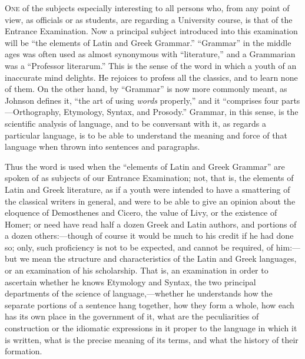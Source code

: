 O\textsc{ne} of the subjects especially interesting to all persons who, from
any point of view, as officials or as students, are regarding a
University course, is that of the Entrance Examination. Now a
principal subject introduced into this examination will be ``the
elements of Latin and Greek Grammar.'' ``Grammar'' in the
middle ages was often used as almost synonymous with
``literature,'' and a Grammarian was a ``Professor
literarum.'' This is the sense of the word in which a youth of an
inaccurate mind delights. He rejoices to profess all the classics, and
to learn none of them. On the other hand, by ``Grammar'' is
now more commonly meant, as Johnson defines it, ``the art of using
\emph{words} properly,'' and it ``comprises four parts—Orthography,
Etymology, Syntax, and Prosody.'' Grammar, in this sense, is the
scientific analysis of language, and to be conversant with it, as
regards a particular language, is to be able to understand the meaning
and force of that language when thrown into sentences and paragraphs.

Thus the word is used when the ``elements of Latin and Greek
Grammar'' are spoken of as subjects of our Entrance Examination;
not, that is, the elements of Latin and Greek literature, as if a
youth were intended to have a smattering of the classical writers in
general, and were to be able to give an opinion about the eloquence of
Demosthenes and Cicero, the value of Livy, or the existence of
Homer; or need have read half a dozen Greek and Latin authors, and
portions of a dozen others:—though of course it would be much to his
credit if he had done so; only, such proficiency is not to be
expected, and cannot be required, of him:—but we mean the structure
and characteristics of the Latin and Greek languages, or an
examination of his scholarship. That is, an examination in order to
ascertain whether he knows Etymology and Syntax, the two principal
departments of the science of language,—whether he understands how
the separate portions of a sentence hang together, how they form a
whole, how each has its own place in the government of it, what are
the peculiarities of construction or the idiomatic expressions in it
proper to the language in which it is written, what is the precise
meaning of its terms, and what the history of their formation.

